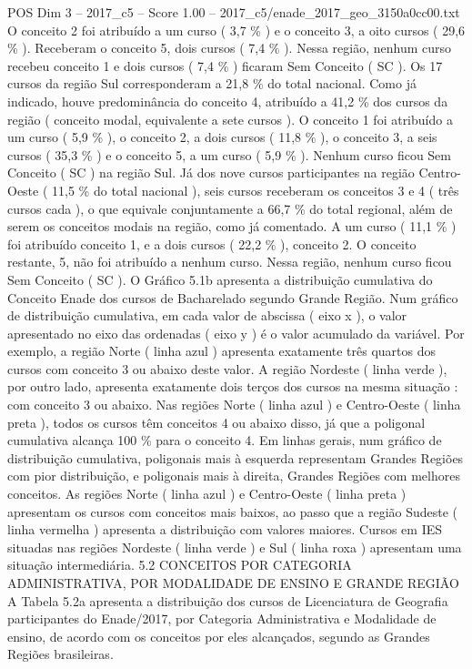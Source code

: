 \begin{textsample}{POS Dim 3 – 2017\_c5 – Score 1.00 – 2017\_c5/enade\_2017\_geo\_3150a0cc00.txt}
O conceito 2 foi atribuído a um curso ( 3,7 \% ) e o conceito 3, a oito cursos ( 29,6 \% ).
Receberam o conceito 5, dois cursos ( 7,4 \% ).
Nessa região, nenhum curso recebeu conceito 1 e dois cursos ( 7,4 \% ) ficaram Sem Conceito ( SC ).
Os 17 cursos da região Sul corresponderam a 21,8 \% do total nacional.
Como já indicado, houve predominância do conceito 4, atribuído a 41,2 \% dos cursos da região ( conceito modal, equivalente a sete cursos ).
O conceito 1 foi atribuído a um curso ( 5,9 \% ), o conceito 2, a dois cursos ( 11,8 \% ), o conceito 3, a seis cursos ( 35,3 \% ) e o conceito 5, a um curso ( 5,9 \% ).
Nenhum curso ficou Sem Conceito ( SC ) na região Sul.
Já dos nove cursos participantes na região Centro-Oeste ( 11,5 \% do total nacional ), seis cursos receberam os conceitos 3 e 4 ( três cursos cada ), o que equivale conjuntamente a 66,7 \% do total regional, além de serem os conceitos modais na região, como já comentado.
A um curso ( 11,1 \% ) foi atribuído conceito 1, e a dois cursos ( 22,2 \% ), conceito 2.
O conceito restante, 5, não foi atribuído a nenhum curso.
Nessa região, nenhum curso ficou Sem Conceito ( SC ).
O Gráfico 5.1b apresenta a distribuição cumulativa do Conceito Enade dos cursos de Bacharelado segundo Grande Região.
Num gráfico de distribuição cumulativa, em cada valor de abscissa ( eixo x ), o valor apresentado no eixo das ordenadas ( eixo y ) é o valor acumulado da variável.
Por exemplo, a região Norte ( linha azul ) apresenta exatamente três quartos dos cursos com conceito 3 ou abaixo deste valor.
A região Nordeste ( linha verde ), por outro lado, apresenta exatamente dois terços dos cursos na mesma situação : com conceito 3 ou abaixo.
Nas regiões Norte ( linha azul ) e Centro-Oeste ( linha preta ), todos os cursos têm conceitos 4 ou abaixo disso, já que a poligonal cumulativa alcança 100 \% para o conceito 4.
Em linhas gerais, num gráfico de distribuição cumulativa, poligonais mais à esquerda representam Grandes Regiões com pior distribuição, e poligonais mais à direita, Grandes Regiões com melhores conceitos.
As regiões Norte ( linha azul ) e Centro-Oeste ( linha preta ) apresentam os cursos com conceitos mais baixos, ao passo que a região Sudeste ( linha vermelha ) apresenta a distribuição com valores maiores.
Cursos em IES situadas nas regiões Nordeste ( linha verde ) e Sul ( linha roxa ) apresentam uma situação intermediária. 5.2 CONCEITOS POR CATEGORIA ADMINISTRATIVA, POR MODALIDADE DE ENSINO E GRANDE REGIÃO A Tabela 5.2a apresenta a distribuição dos cursos de Licenciatura de Geografia participantes do Enade/2017, por Categoria Administrativa e Modalidade de ensino, de acordo com os conceitos por eles alcançados, segundo as Grandes Regiões brasileiras.

\end{textsample}
